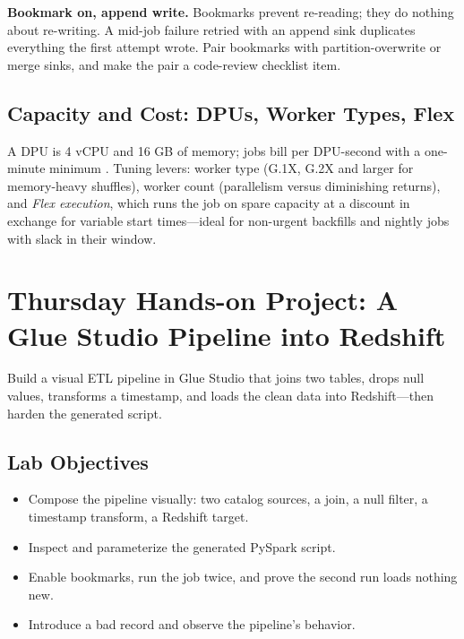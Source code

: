 \begin{pitfall}
\textbf{Bookmark on, append write.} Bookmarks prevent re-reading; they do nothing about re-writing. A mid-job failure retried with an append sink duplicates everything the first attempt wrote. Pair bookmarks with partition-overwrite or merge sinks, and make the pair a code-review checklist item.
\end{pitfall}

\subsection{Capacity and Cost: DPUs, Worker Types, Flex}
A DPU is 4 vCPU and 16 GB of memory; jobs bill per DPU-second with a one-minute minimum \cite{awsGlueDocs}. Tuning levers: worker type (G.1X, G.2X and larger for memory-heavy shuffles), worker count (parallelism versus diminishing returns), and \emph{Flex execution}, which runs the job on spare capacity at a discount in exchange for variable start times---ideal for non-urgent backfills and nightly jobs with slack in their window.

\section{Thursday Hands-on Project: A Glue Studio Pipeline into Redshift}
Build a visual ETL pipeline in Glue Studio that joins two tables, drops null values, transforms a timestamp, and loads the clean data into Redshift---then harden the generated script.

\subsection*{Lab Objectives}
\begin{itemize}
    \item Compose the pipeline visually: two catalog sources, a join, a null filter, a timestamp transform, a Redshift target.
    \item Inspect and parameterize the generated PySpark script.
    \item Enable bookmarks, run the job twice, and prove the second run loads nothing new.
    \item Introduce a bad record and observe the pipeline's behavior.
\end{itemize}

